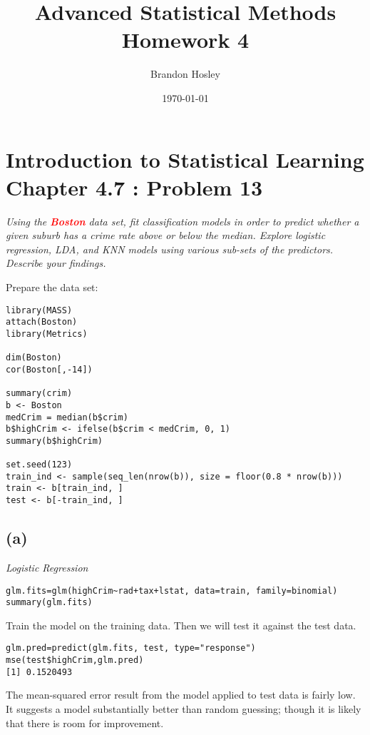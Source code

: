 \documentclass[a4paper,man,natbib]{apa6}
\title{Advanced Statistical Methods Homework 4}
\author{Brandon Hosley}
\date{\today}
\affiliation{University of Illinois - Springfield}
\begin{document}
\maketitle
\singlespacing

\section{Introduction to Statistical Learning \\ Chapter 4.7 : Problem 13}
\emph{
Using the \textbf{\textcolor{red}{Boston}} data set, 
fit classification models in order to predict
whether a given suburb has a crime rate above or below the median.
Explore logistic regression, LDA, and KNN models using various sub-sets of the predictors. Describe your findings.}

Prepare the data set:

\begin{verbatim}
library(MASS)
attach(Boston)
library(Metrics)

dim(Boston)
cor(Boston[,-14])

summary(crim)
b <- Boston
medCrim = median(b$crim)
b$highCrim <- ifelse(b$crim < medCrim, 0, 1)
summary(b$highCrim)

set.seed(123)
train_ind <- sample(seq_len(nrow(b)), size = floor(0.8 * nrow(b)))
train <- b[train_ind, ]
test <- b[-train_ind, ]
\end{verbatim}

\subsection{(a)} 
\emph{Logistic Regression}
\begin{verbatim}
glm.fits=glm(highCrim~rad+tax+lstat, data=train, family=binomial)
summary(glm.fits)
\end{verbatim}

Train the model on the training data. Then we will test it against the test data.

\begin{verbatim}
glm.pred=predict(glm.fits, test, type="response")
mse(test$highCrim,glm.pred)
[1] 0.1520493
\end{verbatim}

The mean-squared error result from the model applied to test data is fairly low. It suggests a model substantially better than random guessing; though it is likely that there is room for improvement.
\end{document}
